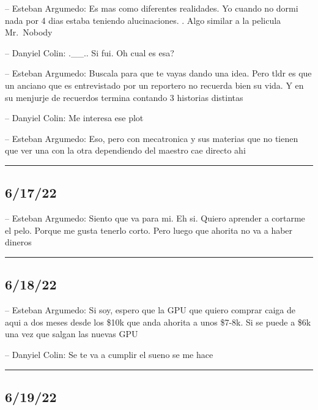 -- Esteban Argumedo: Es mas como diferentes realidades. Yo cuando no
dormi nada por 4 dias estaba teniendo alucinaciones. . Algo similar a la
pelicula Mr.~Nobody

-- Danyiel Colin: .\_\_.. Si fui. Oh cual es esa?

-- Esteban Argumedo: Buscala para que te vayas dando una idea. Pero tldr
es que un anciano que es entrevistado por un reportero no recuerda bien
su vida. Y en su menjurje de recuerdos termina contando 3 historias
distintas

-- Danyiel Colin: Me interesa ese plot

-- Esteban Argumedo: Eso, pero con mecatronica y sus materias que no
tienen que ver una con la otra dependiendo del maestro cae directo ahi

\begin{center}\rule{0.5\linewidth}{0.5pt}\end{center}

\hypertarget{section-104}{%
\subsection{6/17/22}\label{section-104}}

-- Esteban Argumedo: Siento que va para mi. Eh si. Quiero aprender a
cortarme el pelo. Porque me gusta tenerlo corto. Pero luego que ahorita
no va a haber dineros

\begin{center}\rule{0.5\linewidth}{0.5pt}\end{center}

\hypertarget{section-105}{%
\subsection{6/18/22}\label{section-105}}

-- Esteban Argumedo: Si soy, espero que la GPU que quiero comprar caiga
de aqui a dos meses desde los \$10k que anda ahorita a unos \$7-8k. Si
se puede a \$6k una vez que salgan las nuevas GPU

-- Danyiel Colin: Se te va a cumplir el sueno se me hace

\begin{center}\rule{0.5\linewidth}{0.5pt}\end{center}

\hypertarget{section-106}{%
\subsection{6/19/22}\label{section-106}}

